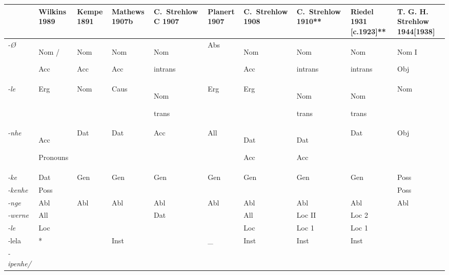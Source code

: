 \begin{sidewaystable}
\small
 \begin{tabularx}{\textwidth}{QQQQQQQQQQ}
\lsptoprule
 & {  {Wilkins} }  {1989}  & {  {Kempe} }  {1891}  & {  {Mathews} }  {1907b} &  {C.~Strehlow}  {C 1907} & {  {Planert} }   {1907}  & {  {C.~Strehlow} }  {1908}  & {  {C.~Strehlow} }  {1910**} & {  {Riedel} }  {1931 [c.1923]**}  & {  {T. G. H.} } {  {Strehlow} }   {1944[1938]} \\
\midrule
 \textit{{}-Ø}  & Nom /

Acc & { {Nom} }

 {Acc}  & { {Nom} }

 {Acc}  & { {Nom} }

 {intrans}
 & {Abs}
 & { {Nom} }

 {Acc}  & { {Nom} }

 {intrans}
 & { {Nom} }

 {intrans}
 & { {Nom I} }

 {Obj} \\
 \textit{{}-le}  & Erg & {Nom}  & {Caus}  & { {Nom}}

 {trans}
 & {Erg}  & {Erg}  & { {Nom}}

 {trans}
 & { {Nom}}

 {trans}
 & {Nom } \\
 \textit{{}-nhe}  & Acc

Pronouns & {Dat}  & {Dat}  & {Acc}
 & {All}  & { {Dat} }

 {Acc}  & { {Dat}}

 {Acc}
 & {Dat}
 & {Obj} \\
 \textit{{}-ke}  & Dat & {Gen}  & {Gen}  & {Gen}
 & {Gen}  & {Gen}  & {Gen}
 & {Gen}
 & {Poss} \\
 \textit{{}-kenhe}  & Poss &  &  &  &  &  &  &  & {Poss} \\
 \textit{{}-nge}  & Abl & {Abl}  & {Abl}  & {Abl}
 & {Abl}  & {Abl}  & {Abl}
 & {Abl}
 & {Abl} \\
 \textit{{}-werne}  & All &  &  & {Dat}
 &  & {All}  & {Loc II}
 & {Loc 2}
 & \\
 \textit{{}-le}  & Loc &  &  &  &  & {Loc}  & {Loc 1}
 & {Loc 1}
 & \\
 \textit{{}-}{lela}
 & * &  & {Inst}  &  & {\_}
 & {Inst}
 & {Inst}
 & {Inst}
 & \\
{ \textit{{}-ipenhe/}}


\end{tabularx}
\end{sidewaystable}

